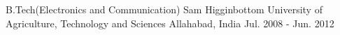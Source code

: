 


\begin{cventries}

\bigskip
\cventry
{B.Tech(Electronics and Communication)} %
{Sam Higginbottom University of Agriculture, Technology and Sciences} %
{Allahabad, India} %
{Jul. 2008 - Jun. 2012} %
{ %
}


\end{cventries}